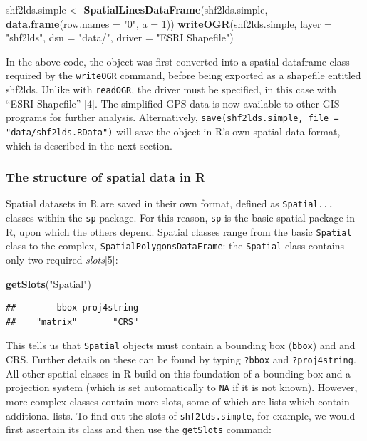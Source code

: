 \documentclass[]{article}
\newenvironment{Shaded}{}{}
\newcommand{\KeywordTok}[1]{\textcolor[rgb]{0.00,0.44,0.13}{\textbf{{#1}}}}
\newcommand{\DataTypeTok}[1]{\textcolor[rgb]{0.56,0.13,0.00}{{#1}}}
\newcommand{\DecValTok}[1]{\textcolor[rgb]{0.25,0.63,0.44}{{#1}}}
\newcommand{\StringTok}[1]{\textcolor[rgb]{0.25,0.44,0.63}{{#1}}}
\newcommand{\NormalTok}[1]{{#1}}
\begin{document}
\begin{Shaded}
\begin{Highlighting}[]
\NormalTok{shf2lds.simple <- }\KeywordTok{SpatialLinesDataFrame}\NormalTok{(shf2lds.simple, }\KeywordTok{data.frame}\NormalTok{(}\DataTypeTok{row.names =} \StringTok{"0"}\NormalTok{, }
    \DataTypeTok{a =} \DecValTok{1}\NormalTok{))}
\KeywordTok{writeOGR}\NormalTok{(shf2lds.simple, }\DataTypeTok{layer =} \StringTok{"shf2lds"}\NormalTok{, }\DataTypeTok{dsn =} \StringTok{"data/"}\NormalTok{, }\DataTypeTok{driver =} \StringTok{"ESRI Shapefile"}\NormalTok{)}
\end{Highlighting}
\end{Shaded}
In the above code, the object was first converted into a spatial
dataframe class required by the \texttt{writeOGR} command, before being
exported as a shapefile entitled shf2lds. Unlike with \texttt{readOGR},
the driver must be specified, in this case with ``ESRI Shapefile''
{[}4{]}. The simplified GPS data is now available to other GIS programs
for further analysis. Alternatively,
\texttt{save(shf2lds.simple, file = "data/shf2lds.RData")} will save the
object in R's own spatial data format, which is described in the next
section.

\subsubsection{The structure of spatial data in R}

Spatial datasets in R are saved in their own format, defined as
\texttt{Spatial...} classes within the \texttt{sp} package. For this
reason, \texttt{sp} is the basic spatial package in R, upon which the
others depend. Spatial classes range from the basic \texttt{Spatial}
class to the complex, \texttt{SpatialPolygonsDataFrame}: the
\texttt{Spatial} class contains only two required \emph{slots}{[}5{]}:

\begin{Shaded}
\begin{Highlighting}[]
\KeywordTok{getSlots}\NormalTok{(}\StringTok{"Spatial"}\NormalTok{)}
\end{Highlighting}
\end{Shaded}
\begin{verbatim}
##        bbox proj4string 
##    "matrix"       "CRS"
\end{verbatim}
This tells us that \texttt{Spatial} objects must contain a bounding box
(\texttt{bbox}) and and CRS. Further details on these can be found by
typing \texttt{?bbox} and \texttt{?proj4string}. All other spatial
classes in R build on this foundation of a bounding box and a projection
system (which is set automatically to \texttt{NA} if it is not known).
However, more complex classes contain more slots, some of which are
lists which contain additional lists. To find out the slots of
\texttt{shf2lds.simple}, for example, we would first ascertain its class
and then use the \texttt{getSlots} command:
\end{document}
